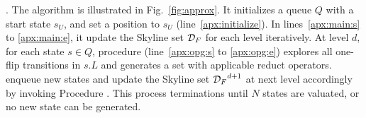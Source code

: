 





. The algorithm \apxmodis is illustrated in Fig.~\ref{fig:approx}. 
It initializes a queue $Q$ with a start state $s_U$, and set a position to $s_U$ (line~\ref{apx:initialize}). In lines~\ref{apx:main:s} to \ref{apx:main:e}, it update the Skyline set ${\mathcal D}_F$ for each level iteratively. 
At level $d$, for each state $s \in Q$, 
procedure \opg (line~\ref{apx:opg:s} to \ref{apx:opg:e}) explores all one-flip transitions in $s.L$ and generates a set with applicable reduct operators. 
\apxmodis 
enqueue %
new states and update the Skyline set ${{\mathcal D}_F}^{d+1}$ at next level accordingly by invoking Procedure \upi. 
This process terminations until 
$N$ states are valuated, or 
no new state can be generated. 

